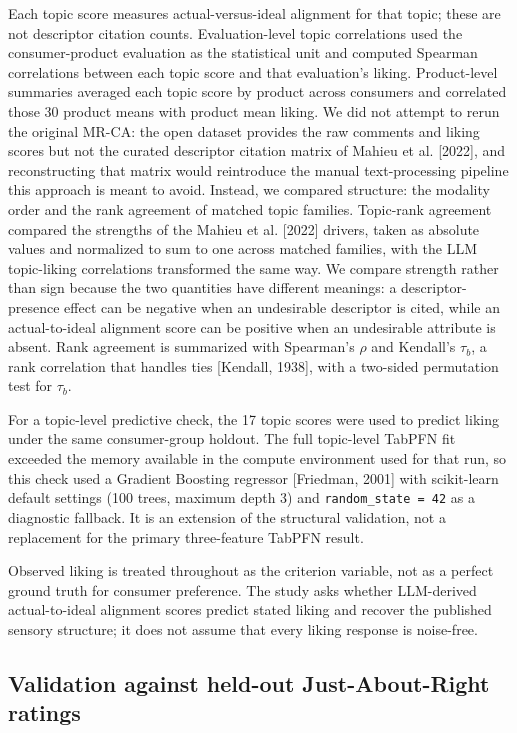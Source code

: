 \documentclass[11pt]{article}
\begin{document}
Each topic score measures actual-versus-ideal alignment for that topic; these
are not descriptor citation counts. Evaluation-level topic correlations used
the consumer-product evaluation as the statistical unit and computed Spearman
correlations between each topic score and that evaluation's liking.
Product-level summaries averaged each topic score by product across consumers
and correlated those 30 product means with product mean liking. We did not
attempt to rerun the original MR-CA: the open dataset provides the raw
comments and liking scores but not the curated descriptor citation matrix of
Mahieu et al. [2022], and reconstructing that matrix would reintroduce the
manual text-processing pipeline this approach is meant to avoid. Instead, we
compared structure: the modality order and the rank agreement of matched topic
families. Topic-rank agreement compared the strengths of the Mahieu et al.
[2022] drivers, taken as absolute values and normalized to sum to one across
matched families, with the LLM topic-liking correlations transformed the same
way. We compare strength rather than sign because the two quantities have
different meanings: a descriptor-presence effect can be negative when an
undesirable descriptor is cited, while an actual-to-ideal alignment score can
be positive when an undesirable attribute is absent. Rank agreement is
summarized with Spearman's $\rho$ and Kendall's $\tau_b$, a rank correlation
that handles ties [Kendall, 1938], with a two-sided permutation test for
$\tau_b$.

For a topic-level predictive check, the 17 topic scores were used to predict
liking under the same consumer-group holdout. The full topic-level TabPFN fit
exceeded the memory available in the compute environment used for that run, so
this check used a Gradient Boosting regressor [Friedman, 2001] with
scikit-learn default settings (100 trees, maximum depth 3) and
\texttt{random\_state = 42} as a diagnostic fallback. It is an extension of the structural validation, not a replacement
for the primary three-feature TabPFN result.

Observed liking is treated throughout as the criterion variable, not as a
perfect ground truth for consumer preference. The study asks whether
LLM-derived actual-to-ideal alignment scores predict stated liking and recover
the published sensory structure; it does not assume that every liking response
is noise-free.

\subsection{Validation against held-out Just-About-Right ratings}
\label{sec:jarmethods}
\end{document}
